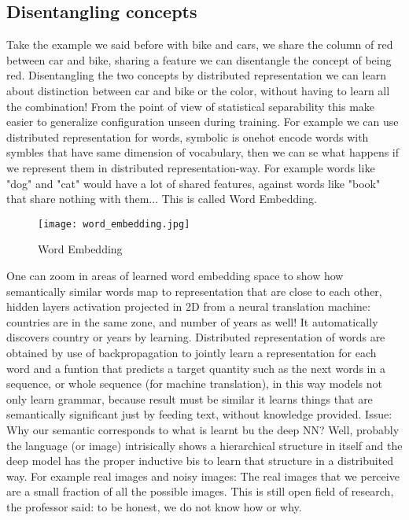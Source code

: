 \documentclass[12pt]{book}
\begin{document}
\subsection{Disentangling concepts}
Take the example we said before with bike and cars, we share the column of red between car and bike, sharing a feature we can disentangle the concept of being red.\newline
Disentangling the two concepts by distributed representation we can learn about distinction between car and bike or the color, without having to learn all the combination!\newline
From the point of view of statistical separability this make easier to generalize configuration unseen during training.\newline
For example we can use distributed representation for words, symbolic is onehot encode words with symbles that have same dimension of vocabulary, then we can se what happens if we represent them in distributed representation-way. For example words like "dog" and "cat" would have a lot of shared features, against words like "book" that share nothing with them...\newline 
This is called Word Embedding. \newline

\begin{figure}[h]
	\centering
	\texttt{[image: word\_embedding.jpg]}
	\caption{Word Embedding}
	\label{fig:word_embedding}
\end{figure}

One can zoom in areas of learned word embedding space to show how semantically similar words map to representation that are close to each other, hidden layers activation projected in 2D from a neural translation machine: countries are in the same zone, and number of years as well! It automatically discovers country or years by learning.\newline
Distributed representation of words are obtained by use of backpropagation to jointly learn a representation for each word and a funtion that predicts a target quantity such as the next words in a sequence, or whole sequence (for machine translation), in this way models not only learn grammar, because result must be similar it learns things that are semantically significant just by feeding text, without knowledge provided.\newline
Issue: Why our semantic corresponds to what is learnt bu the deep NN?\newline
Well, probably the language (or image) intrisically shows a hierarchical structure in itself and the deep model has the proper inductive bis to learn that structure in a distribuited way. For example real images and noisy images: The real images that we perceive are a small fraction of all the possible images. This is still open field of research, the professor said: to be honest, we do not know how or why.
\end{document}
